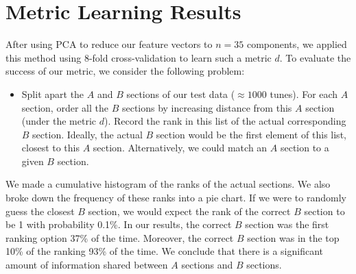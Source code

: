 \documentclass{article} %
\begin{document}
\section{Metric Learning Results}

After using PCA to reduce our feature vectors to $n = 35$ components, we applied
this method using 8-fold cross-validation to learn such a metric $d$. To
evaluate the success of our metric, we consider the following problem:
\begin{itemize}
\item[] Split apart the $A$ and $B$ sections of our test data ($\approx 1000$
tunes). For each $A$ section, order all the $B$ sections by increasing distance
from this $A$ section (under the metric $d$). Record the rank in this list of
the actual corresponding $B$ section. Ideally, the actual $B$ section would be
the first element of this list, closest to this $A$ section. Alternatively, we
could match an $A$ section to a given $B$ section.
\end{itemize}
We made a cumulative histogram of the ranks of the actual sections.%
We also broke down the frequency of these ranks into a pie chart. %
If we were to randomly guess the closest $B$ section, we would expect the rank
of the correct $B$ section to be 1 with probability 0.1\%. In our results, the
correct $B$ section was the first ranking option 37\% of the time. Moreover, the
correct $B$ section was in the top 10\% of the ranking 93\% of the time. We
conclude that there is a significant amount of information shared between $A$
sections and $B$ sections.
\end{document}

